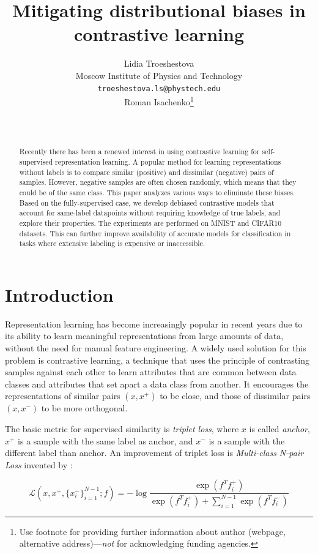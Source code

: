 \documentclass{article}
\title{Mitigating distributional biases in contrastive learning}
\author{ Lidia Troeshestova \\
	Moscow Institute of Physics and Technology\\
	\texttt{troeshestova.ls@phystech.edu} \\
	\And
	Roman Isachenko\thanks{Use footnote for providing further information about author (webpage, alternative address)---\emph{not} for acknowledging funding agencies.} \\
	   \\
	\texttt{} \\
}
\date{}
\begin{document}
\maketitle

\begin{abstract}
	Recently there has been a renewed interest in using contrastive learning for self-supervised representation learning. A popular method for learning representations without labels is to compare similar (positive) and dissimilar (negative) pairs of samples. However, negative samples are often chosen randomly, which means that they could be of the same class. This paper analyzes various ways to eliminate these biases. Based on the fully-supervised case, we develop debiased contrastive models that account for same-label datapoints without requiring knowledge of true labels, and explore their properties. The experiments are performed on MNIST and CIFAR10 datasets. This can further improve availability of accurate models for classification in tasks where extensive labeling is expensive or inaccessible.
\end{abstract}



\section{Introduction}
Representation learning has become increasingly popular in recent years due to its ability to learn meaningful representations from large amounts of data, without the need for manual feature engineering. A widely used solution for this problem is contrastive learning, a technique that uses the principle of contrasting samples against each other to learn attributes that are common between data classes and attributes that set apart a data class from another. It encourages the representations of similar pairs $(x, x^+)$ to be close, and those of dissimilar pairs $(x, x^-)$ to be more orthogonal.

The basic metric for supervised similarity is \textit{triplet loss}, where $x$ is called \textit{anchor}, $x^+$ is a sample with the same label as anchor, and $x^-$ is a sample with the different label than anchor. An improvement of triplet loss is \textit{Multi-class N-pair Loss} invented by \citep{NIPS2016_6b180037}:

\begin{equation}
\mathcal{L}(x, x^+, \{x_i^-\}_{i=1}^{N-1}; f) = - \log \frac{\exp(f^T f_i^+)}{\exp(f^T f_i^+) + \sum _{i=1}^{N-1} \exp(f^Tf_i^-)}
\end{equation}
\end{document}
